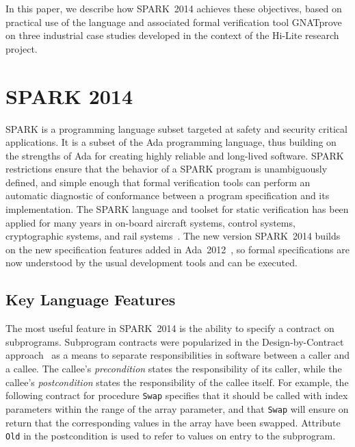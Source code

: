 \documentclass[10pt,a4paper,twocolumn]{article}
\newcommand{\hilite}{Hi-Lite\xspace}
\newcommand{\gnatprove}{GNATprove\xspace}
\newcommand{\newspark}{SPARK~2014\xspace}
\newcommand{\adatwtw}{Ada~2012\xspace}
\newcommand{\SPARK}[1]{\lstinline[language=Ada,basicstyle={\footnotesize
      \sffamily},framesep=0pt]$#1$}
\begin{document}
In this paper, we describe how \newspark achieves these objectives, based on
practical use of the language and associated formal verification tool
\gnatprove on three industrial case studies developed in the context of the
\hilite research project.

\section{SPARK 2014}


SPARK is a programming language subset targeted at safety and security critical
applications. It is a subset of the Ada programming language, thus building on
the strengths of Ada for creating highly reliable and long-lived
software. SPARK restrictions ensure that the behavior of a SPARK program is
unambiguously defined, and simple enough that formal verification tools can
perform an automatic diagnostic of conformance between a program specification
and its implementation. The SPARK language and toolset for static verification
has been applied for many years in on-board aircraft systems, control systems,
cryptographic systems, and rail systems~\cite{sparkbook2012,oneill2012}. The
new version \newspark builds on the new specification features added in
\adatwtw~\cite{ada2012rationale}, so formal specifications are now understood
by the usual development tools and can be executed.

\subsection{Key Language Features}

The most useful feature in \newspark is the ability to specify a contract on
subprograms. Subprogram contracts were popularized in the Design-by-Contract
approach~\cite{meyer:1988:OSC} as a means to separate responsibilities in
software between a caller and a callee. The callee's \textit{precondition}
states the responsibility of its caller, while the callee's
\textit{postcondition} states the responsibility of the callee itself.  For
example, the following contract for procedure \SPARK{Swap} specifies that it
should be called with index parameters within the range of the array parameter,
and that \SPARK{Swap} will ensure on return that the corresponding values in
the array have been swapped. Attribute \SPARK{Old} in the postcondition is used
to refer to values on entry to the subprogram.
\end{document}
